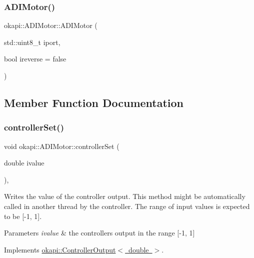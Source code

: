 \subsubsection{\texorpdfstring{ADIMotor()}{ADIMotor()}}
{\footnotesize\ttfamily okapi\+::\+A\+D\+I\+Motor\+::\+A\+D\+I\+Motor (\begin{DoxyParamCaption}\item[{std\+::uint8\+\_\+t}]{iport,  }\item[{bool}]{ireverse = {\ttfamily false} }\end{DoxyParamCaption})}



\subsection{Member Function Documentation}
\mbox{\label{classokapi_1_1ADIMotor_ac290a47e904c728ff1e61ee85408a1be}} 
\subsubsection{\texorpdfstring{controllerSet()}{controllerSet()}}
{\footnotesize\ttfamily void okapi\+::\+A\+D\+I\+Motor\+::controller\+Set (\begin{DoxyParamCaption}\item[{double}]{ivalue }\end{DoxyParamCaption})\hspace{0.3cm}{\ttfamily [override]}, {\ttfamily [virtual]}}

Writes the value of the controller output. This method might be automatically called in another thread by the controller. The range of input values is expected to be \mbox{[}-\/1, 1\mbox{]}.


\begin{DoxyParams}{Parameters}
{\em ivalue} & the controller\textquotesingle{}s output in the range \mbox{[}-\/1, 1\mbox{]} \\
\hline
\end{DoxyParams}


Implements \mbox{\hyperlink{classokapi_1_1ControllerOutput_a360c08f0c10b36f882d6d3100c2cad49}{okapi\+::\+Controller\+Output$<$ double $>$}}.

\mbox{\label{classokapi_1_1ADIMotor_a4c992efbe21467c0339308fba926b1a6}} 

